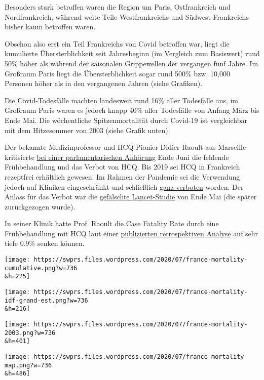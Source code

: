 Besonders stark betroffen waren die Region um Paris, Ostfrankreich und
Nordfrankreich, während weite Teile Westfrankreichs und
Südwest-Frankreichs bisher kaum betroffen waren.

Obschon also erst ein Teil Frankreichs von Covid betroffen war, liegt
die kumulierte Übersterblichkeit seit Jahresbeginn (im Vergleich zum
Basiswert) rund 50\% höher als während der saisonalen Grippewellen der
vergangen fünf Jahre. Im Großraum Paris liegt die Übersterblichkeit
sogar rund 500\% bzw. 10,000 Personen höher als in den vergangenen
Jahren (siehe Grafiken).

Die Covid-Todesfälle machten landesweit rund 16\% aller Todesfälle aus,
im Großraum Paris waren es jedoch knapp 40\% aller Todesfälle von Anfang
März bis Ende Mai. Die wöchentliche Spitzenmortalität durch Covid-19 ist
vergleichbar mit dem Hitzesommer von 2003 (siehe Grafik unten).

Der bekannte Medizinprofessor und HCQ-Pionier Didier Raoult aus
Marseille kritisierte
\href{http://covexit.com/shock-testimony-of-professor-raoult-at-french-national-assembly/}{bei
einer parlamentarischen Anhörung} Ende Juni die fehlende Frühbehandlung
und das Verbot von HCQ. Bis 2019 sei HCQ in Frankreich rezeptfrei
erhältlich gewesen. Im Rahmen der Pandemie sei die Verwendung jedoch auf
Kliniken eingeschränkt und schließlich
\href{https://www.france24.com/en/20200527-france-revokes-decree-authorising-use-of-hydroxychloroquine-to-treat-covid-19}{ganz
verboten} worden. Der Anlass für das Verbot war die
\href{https://omnij.org/Gilead:_Twenty-one_billion_reasons_to_discredit_hydroxychloroquine_(ORIGINAL_ARTICLE)}{gefälschte
Lancet-Studie} von Ende Mai (die später zurückgezogen wurde).

In seiner Klinik hatte Prof. Raoult die Case Fatality Rate durch eine
Frühbehandlung mit HCQ laut einer
\href{https://www.sciencedirect.com/science/article/pii/S1477893920302817}{publizierten
retrospektiven Analyse} auf sehr tiefe 0.9\% senken können.

\texttt{[image: https://swprs.files.wordpress.com/2020/07/france-mortality-cumulative.png?w=736\\\&h=225]}

\texttt{[image: https://swprs.files.wordpress.com/2020/07/france-mortality-idf-grand-est.png?w=736\\\&h=216]}

\texttt{[image: https://swprs.files.wordpress.com/2020/07/france-mortality-2003.png?w=736\\\&h=401]}

\texttt{[image: https://swprs.files.wordpress.com/2020/07/france-mortality-map.png?w=736\\\&h=486]}

